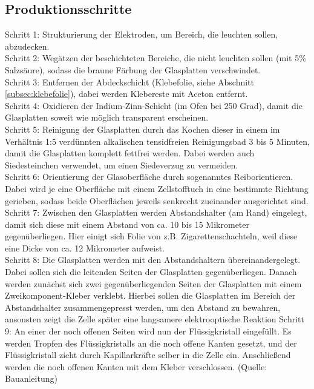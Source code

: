\subsection{Produktionsschritte}
Schritt 1: Strukturierung der Elektroden, um Bereich, die leuchten sollen, abzudecken.\\
Schritt 2: Wegätzen der beschichteten Bereiche, die nicht leuchten sollen (mit 5\% Salzsäure), sodass die braune Färbung der Glasplatten verschwindet.\\
Schritt 3: Entfernen der Abdeckschicht (Klebefolie, siehe Abschnitt \ref{subsec:klebefolie}), dabei werden Klebereste mit Aceton entfernt.\\
Schritt 4: Oxidieren der Indium-Zinn-Schicht (im Ofen bei 250 Grad), damit die Glasplatten soweit wie möglich transparent erscheinen.\\
Schritt 5: Reinigung der Glasplatten durch das Kochen dieser in einem im Verhältnis 1:5 verdünnten alkalischen tensidfreien Reinigungsbad 3 bis 5 Minuten, damit die Glasplatten komplett fettfrei werden. Dabei werden auch Siedesteinchen verwendet, um einen Siedeverzug zu vermeiden.\\
Schritt 6: Orientierung der Glasoberfläche durch sogenanntes {\quote Reiborientieren}. 
Dabei wird je eine Oberfläche mit einem Zellstofftuch in eine bestimmte Richtung gerieben, sodass beide Oberflächen jeweils senkrecht zueinander ausgerichtet sind. \\
Schritt 7: Zwischen den Glasplatten werden Abstandshalter (am Rand) eingelegt, damit sich diese mit einem Abstand von ca. 10 bis 15 Mikrometer gegenüberliegen. Hier einigt sich Folie von z.B. Zigarettenschachteln, weil diese eine Dicke von ca. 12 Mikrometer aufweist.\\
Schritt 8: Die Glasplatten werden mit den Abstandshaltern übereinandergelegt. Dabei sollen sich die leitenden Seiten der Glasplatten gegenüberliegen. Danach werden zunächst sich zwei gegenüberliegenden Seiten der Glasplatten mit einem Zweikomponent-Kleber verklebt. Hierbei sollen die Glasplatten im Bereich der Abstandshalter zusammengepresst werden, um den Abstand zu bewahren, ansonsten zeigt die Zelle später eine langsamere elektrooptische Reaktion
Schritt 9: An einer der noch offenen Seiten wird nun der Flüssigkristall eingefüllt. Es werden Tropfen des  Flüssigkristalls an die noch offene Kanten gesetzt, und der Flüssigkristall zieht durch Kapillarkräfte selber in die Zelle ein. Anschließend werden die noch offenen Kanten mit dem Kleber verschlossen.	
(Quelle: Bauanleitung)

